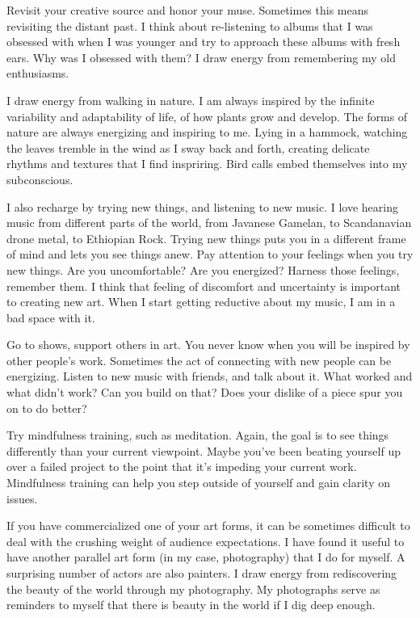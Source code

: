 \documentclass[
]{book}
\begin{document}
Revisit your creative source and honor your muse. Sometimes this means revisiting the distant past. I think about re-listening to albums that I was obsessed with when I was younger and try to approach these albums with fresh ears. Why was I obsessed with them? I draw energy from remembering my old enthusiasms.

I draw energy from walking in nature. I am always inspired by the infinite variability and adaptability of life, of how plants grow and develop. The forms of nature are always energizing and inspiring to me. Lying in a hammock, watching the leaves tremble in the wind as I sway back and forth, creating delicate rhythms and textures that I find inspriring. Bird calls embed themselves into my subconscious.

I also recharge by trying new things, and listening to new music. I love hearing music from different parts of the world, from Javanese Gamelan, to Scandanavian drone metal, to Ethiopian Rock. Trying new things puts you in a different frame of mind and lets you see things anew. Pay attention to your feelings when you try new things. Are you uncomfortable? Are you energized? Harness those feelings, remember them. I think that feeling of discomfort and uncertainty is important to creating new art. When I start getting reductive about my music, I am in a bad space with it.

Go to shows, support others in art. You never know when you will be inspired by other people's work. Sometimes the act of connecting with new people can be energizing. Listen to new music with friends, and talk about it. What worked and what didn't work? Can you build on that? Does your dislike of a piece spur you on to do better?

Try mindfulness training, such as meditation. Again, the goal is to see things differently than your current viewpoint. Maybe you've been beating yourself up over a failed project to the point that it's impeding your current work. Mindfulness training can help you step outside of yourself and gain clarity on issues.

If you have commercialized one of your art forms, it can be sometimes difficult to deal with the crushing weight of audience expectations. I have found it useful to have another parallel art form (in my case, photography) that I do for myself. A surprising number of actors are also painters. I draw energy from rediscovering the beauty of the world through my photography. My photographs serve as reminders to myself that there is beauty in the world if I dig deep enough.
\end{document}
